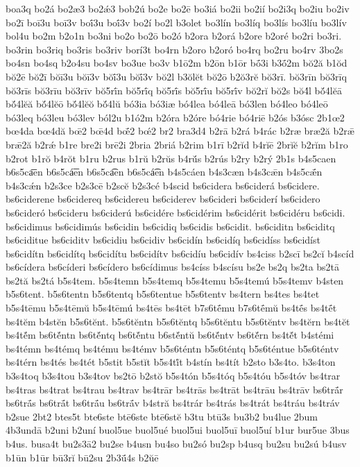 {boa3q
bo2á
bo2æ3
bo2ǽ3
bob2ú
bo2e
bo2ē
bo3iá
bo2ii
bo2ií
bo2i3q
bo2iu
bo2iv
bo2ī
boī3u
boī3v
boī́3u
boī́3v
bo2í
bo2l
b3olet
bo3lín
bo3líq
bo3lís
bo3líu
bo3lív
bol4u
bo2m
b2o1n
bo3ni
bo2o
bo2ō
bo2ó
b2ora
b2orá
b2ore
b2oré
bo2ri
bo3ri.
bo3rin
bo3riq
bo3ris
bo3riv
borí3t
bo4rn
b2oro
b2oró
bo4rq
bo2ru
bo4rv
3bo2s
bo4sn
bo4sq
b2o4su
bo4sv
bo3ue
bo3v
b1ō2m
b2ōn
b1ōr
bṓ3i
b3ṓ2m
bŏ2ă
b1ŏd
bŏ2ē
bŏ2ī
bŏī3u
bŏī3v
bŏī́3u
bŏī́3v
bŏ2l
b3ŏlĕt
bŏ2ō
b2ŏ3rĕ
bŏ3rī.
bŏ3rīn
bŏ3rīq
bŏ3rīs
bŏ3rīu
bŏ3rīv
bŏ5rī́n
bŏ5rī́q
bŏ5rī́s
bŏ5rī́u
bŏ5rī́v
bŏ2rĭ
bŏ2s
bŏ4́l
bŏ́4lĕā
bŏ́4lĕă
bŏ́4lĕō
bŏ́4lĕŏ
bŏ́4lŭ
bó3ia
bó3iæ
bó4lea
bó4leā
bó3len
bó4leo
bó4leō
bó3leq
bó3leu
bó3lev
ból2u
b1ó2m
b2óra
b2óre
bó4rie
bó4riē
b2ós
b3ósc
2b1œ2
bœ4da
bœ4dă
bœ̄2
bœ̄4d
bœ̄́2
bœ́2
br2
bra3d4
b2rā
b2rá
b4rác
b2ræ
bræ2ă
b2rǣ
brǣ2ă
b2rǽ
b1re
bre2i
brē2i
2bria
2briá
b2rim
b1rī
b2rĭd
b4rĭē
2brĭĕ
b2rĭm
b1ro
b2rot
b1rŏ
b4rŏt
b1ru
b2rus
b1rŭ
b2rŭs
b4rŭ́s
b2rús
b2ry
b2rý
2b1s
b4s5caen
b6s5ca͞en
b6s5cá͞en
b6s5ca͡en
b6s5cá͡en
b4s5cáen
b4s3cæn
b4s3cǣn
b4s5cǣ́n
b4s3cǽn
b2s3ce
b2s3cē
b2scĕ
b2s3cé
b4scid
bs6cidera
bs6ciderá
bs6cidere.
bs6ciderene
bs6cidereq
bs6cidereu
bs6ciderev
bs6cideri
bs6ciderí
bs6cidero
bs6cideró
bs6cideru
bs6ciderú
bs6cidére
bs6cidérim
bs6cidérit
bs6cidéru
bs6cidi.
bs6cidimus
bs6cidimús
bs6cidin
bs6cidiq
bs6cidis
bs6cidit.
bs6ciditn
bs6ciditq
bs6ciditue
bs6ciditv
bs6cidiu
bs6cidiv
bs6cidín
bs6cidíq
bs6cidíss
bs6cidíst
bs6cidítn
bs6cidítq
bs6cidítu
bs6cidítv
bs6cidíu
bs6cidív
bs4ciss
b2scī
bs2cĭ
b4scíd
bs6cídera
bs6cíderi
bs6cídero
bs6cídimus
bs4císs
b4scísu
bs2e
bs2q
bs2ta
bs2tā
bs2tă
bs2tá
b5s4tem.
b5s4temn
b5s4temq
b5s4temu
b5s4temú
b5s4temv
b4sten
b5s6tent.
b5s6tentn
b5s6tentq
b5s6tentue
b5s6tentv
bs4tern
bs4tes
bs4tet
b5s4tēmu
b5s4tēmŭ
b5s4tēmú
bs4tēs
bs4tēt
b7s6tḗmu
b7s6tḗmŭ
bs4tḗs
bs4tḗt
bs4tĕm
b4stĕn
b5s6tĕnt.
b5s6tĕntn
b5s6tĕntq
b5s6tĕntu
b5s6tĕntv
bs4tĕrn
bs4tĕt
bs4tĕ́m
bs6tĕ́ntn
bs6tĕ́ntq
bs6tĕ́ntu
b6stĕ́ntŭ
bs6tĕ́ntv
bs6tĕ́rn
bs4tĕ́t
b4stémi
bs4témn
bs4témq
bs4tému
bs4témv
b5s6téntn
b5s6téntq
b5s6téntue
b5s6téntv
bs4térn
bs4tés
bs4tét
b5stit
b5stĭt
b5s4tĭ́t
b4stín
bs4tít
b2sto
b3s4to.
b3s4ton
b3s4toq
b3s4tou
b3s4tov
bs2tō
b2stŏ
b5s4tón
b5s4tóq
b5s4tóu
b5s4tóv
bs4trar
bs4tras
bs4trat
bs4trau
bs4trav
bs4trār
bs4trās
bs4trāt
bs4trāu
bs4trāv
bs6trā́r
bs6trā́s
bs6trā́t
bs6trā́u
bs6trā́v
b4stră
bs4trár
bs4trás
bs4trát
bs4tráu
bs4tráv
b2sue
2bt2
btes5t
bte6ste
btē6ste
btē6stĕ
b3tu
btū3s
bu3b2
bu4lue
2bum
4b3undā
b2uni
b2uní
buol5ue
buol5ué
buol5ui
buol5uī
buol5uí
b1ur
bur5ue
3bus
b4us.
busa4t
bu2s3ā2
bu2se
b4usn
bu4so
bu2só
bu2sp
b4usq
bu2su
bu2sú
b4usv
b1ūn
b1ūr
bū3rĭ
bū2su
2b3ū́4s
b2ŭē
}
